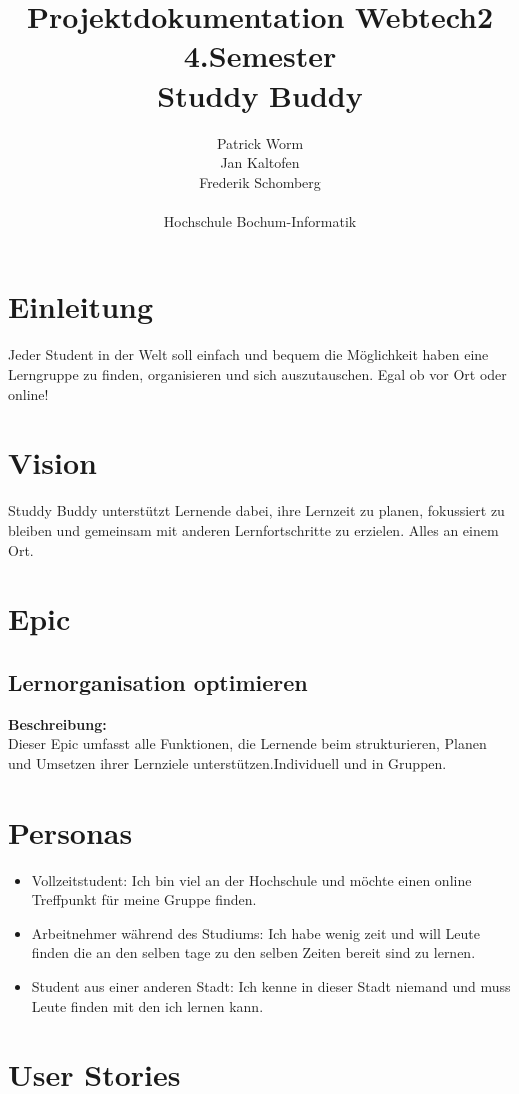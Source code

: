 \documentclass[12pt,a4paper]{article}
\title{%
    Projektdokumentation Webtech2\\
    \large 4.Semester\\
    \vspace{0.5cm}
    \textbf{Studdy Buddy}
}
\author{
    Patrick Worm\\
    Jan Kaltofen\\
    Frederik Schomberg\\
    \\
    Hochschule Bochum-Informatik\\
}
\date{}
\begin{document}
\maketitle

\tableofcontents
\newpage

\section{Einleitung}
Jeder Student in der Welt soll einfach und bequem die Möglichkeit haben eine Lerngruppe zu finden, organisieren und sich auszutauschen. Egal ob vor Ort oder online!

\section{Vision}
Studdy Buddy unterstützt Lernende dabei, ihre Lernzeit zu planen, fokussiert zu bleiben und gemeinsam mit anderen Lernfortschritte zu erzielen. Alles an einem Ort.

\section{Epic}
\subsection{Lernorganisation optimieren}
\textbf{Beschreibung:}\\
Dieser Epic umfasst alle Funktionen, die Lernende beim strukturieren, Planen und Umsetzen ihrer Lernziele unterstützen.Individuell und in Gruppen.

\section{Personas}

\begin{itemize}
  \item Vollzeitstudent: Ich bin viel an der Hochschule und möchte einen online Treffpunkt für meine Gruppe finden.
  \item Arbeitnehmer während des Studiums: Ich habe wenig zeit und will Leute finden die an den selben tage zu den selben Zeiten bereit sind zu lernen.
  \item Student aus einer anderen Stadt: Ich kenne in dieser Stadt niemand und muss Leute finden mit den ich lernen kann.
\end{itemize}

\section{User Stories}
\end{document}
